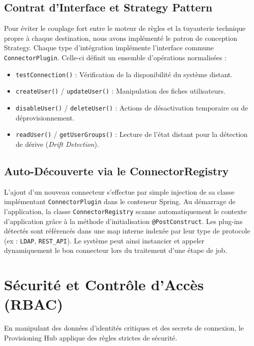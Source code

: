 \subsection{Contrat d'Interface et Strategy Pattern}
Pour éviter le couplage fort entre le moteur de règles et la tuyauterie technique propre à chaque destination, nous avons implémenté le patron de conception Strategy. Chaque type d'intégration implémente l'interface commune \texttt{ConnectorPlugin}. Celle-ci définit un ensemble d'opérations normalisées :
\begin{itemize}
    \item \texttt{testConnection()} : Vérification de la disponibilité du système distant.
    \item \texttt{createUser()} / \texttt{updateUser()} : Manipulation des fiches utilisateurs.
    \item \texttt{disableUser()} / \texttt{deleteUser()} : Actions de désactivation temporaire ou de déprovisionnement.
    \item \texttt{readUser()} / \texttt{getUserGroups()} : Lecture de l'état distant pour la détection de dérive (\textit{Drift Detection}).
\end{itemize}

\subsection{Auto-Découverte via le ConnectorRegistry}
L'ajout d'un nouveau connecteur s'effectue par simple injection de sa classe implémentant \texttt{ConnectorPlugin} dans le conteneur Spring. Au démarrage de l'application, la classe \texttt{ConnectorRegistry} scanne automatiquement le contexte d'application grâce à la méthode d'initialisation \texttt{@PostConstruct}. Les plug-ins détectés sont référencés dans une map interne indexée par leur type de protocole (ex : \texttt{LDAP}, \texttt{REST\_API}). Le système peut ainsi instancier et appeler dynamiquement le bon connecteur lors du traitement d'une étape de job.

\section{Sécurité et Contrôle d'Accès (RBAC)}
En manipulant des données d'identités critiques et des secrets de connexion, le Provisioning Hub applique des règles strictes de sécurité.


